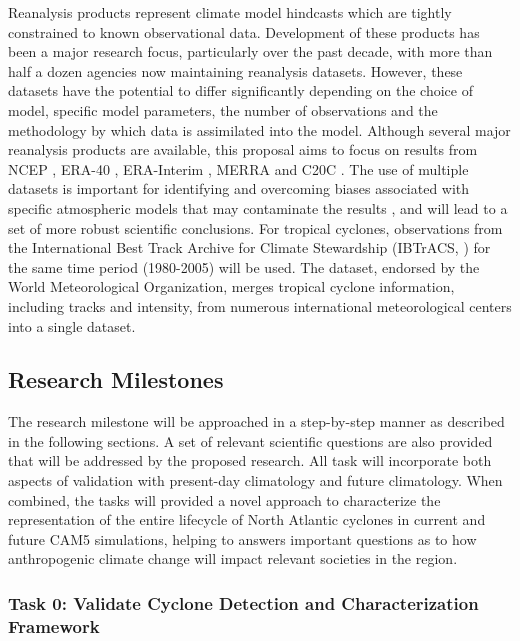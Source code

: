 \documentclass[11pt]{article}
\begin{document}
Reanalysis products represent climate model hindcasts which are tightly constrained to known observational data.  Development of these products has been a major research focus, particularly over the past decade, with more than half a dozen agencies now maintaining reanalysis datasets.  However, these datasets have the potential to differ significantly depending on the choice of model, specific model parameters, the number of observations and the methodology by which data is assimilated into the model.  Although several major reanalysis products are available, this proposal aims to focus on results from NCEP \citep{kalnay1996ncep}, ERA-40 \citep{uppala2005era}, ERA-Interim \citep{simmons2007era}, MERRA \citep{rienecker2011merra} and C20C \citep{compo2011twentieth}.  The use of multiple datasets is important for identifying and overcoming biases associated with specific atmospheric models that may contaminate the results \citep{jun2008spatial}, and will lead to a set of more robust scientific conclusions. For tropical cyclones, observations from the International Best Track Archive for Climate Stewardship (IBTrACS, \citet{Knapp2010}) for the same time period (1980-2005) will be used. The dataset, endorsed by the World Meteorological Organization, merges tropical cyclone information, including tracks and intensity, from numerous international meteorological centers into a single dataset.

\subsection{Research Milestones} \label{sec:ResearchMilestones}

The research milestone will be approached in a step-by-step manner as described in the following sections. A set of relevant scientific questions are also provided that will be addressed by the proposed research. All task will incorporate both aspects of validation with present-day climatology and future climatology. When combined, the tasks will provided a novel approach to characterize the representation of the entire lifecycle of North Atlantic cyclones in current and future CAM5 simulations, helping to answers important questions as to how anthropogenic climate change will impact relevant societies in the region.

\subsubsection{Task 0: Validate Cyclone Detection and Characterization Framework}
\end{document}
